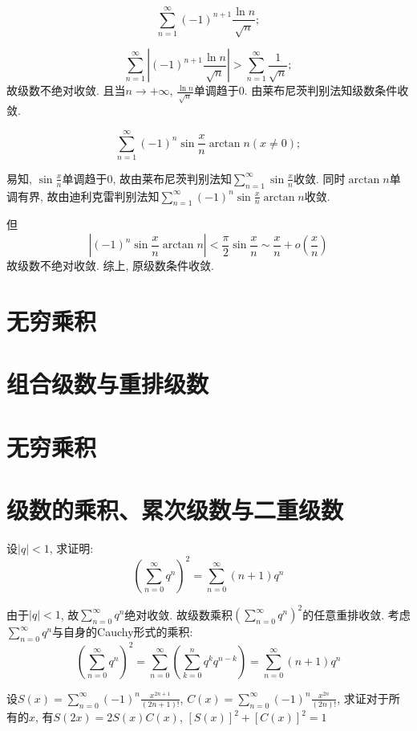 \[
    \sum_{n=1}^{\infty} (-1)^{n+1} \frac{\ln n}{\sqrt{n}};
\]

\[
    \sum_{n=1}^{\infty} \left| (-1)^{n+1} \frac{\ln n}{\sqrt{n}} \right|
    > \sum_{n=1}^{\infty} \frac{1}{\sqrt{n}} ;
\]
故级数不绝对收敛.
且当\(n \to + \infty\), \(\frac{\ln n}{\sqrt{n}}\)单调趋于0. 由莱布尼茨判别法知级数条件收敛.

\[
    \sum_{n=1}^{\infty} (-1)^n \sin \frac{x}{n} \arctan n (x \neq 0);
\]

易知, \(\sin \frac{x}{n}\)单调趋于0, 故由莱布尼茨判别法知\(\sum_{n=1}^{\infty} \sin
\frac{x}{n}\)收敛. 同时\(\arctan n\)单调有界, 故由迪利克雷判别法知\(\sum_{n=1}^{\infty}
(-1)^{n} \sin \frac{x}{n} \arctan n\)收敛.

但\[
    \left| (-1)^{n}\sin \frac{x}{n} \arctan n \right| < \frac{\pi}{2}
    \sin \frac{x}{n} \sim \frac{x}{n} + o(\frac{x}{n})
\]
故级数不绝对收敛. 综上, 原级数条件收敛.

\section{无穷乘积}
\section{组合级数与重排级数}
\section{无穷乘积}
\section{级数的乘积、累次级数与二重级数}
\begin{problem}
    设\(\left\vert q \right\vert < 1\), 求证明:
    \[
        \left( \sum_{n=0}^{\infty} q^{n} \right)^2
        =\sum_{n=0}^{\infty} (n + 1) q^{n}
    \]
\end{problem}
\begin{solution}
    由于\(\left\vert q \right\vert < 1\), 故\(\sum_{n=0}^{\infty}
    q^{n}\)绝对收敛. 故级数乘积\(\left( \sum_{n=0}^{\infty} q^{n} \right)^2\)的任意重排收敛.
    考虑\(\sum_{n=0}^{\infty} q^{n}\)与自身的Cauchy形式的乘积:
    \[
        \left( \sum_{n=0}^{\infty} q^{n} \right)^2
        =\sum_{n=0}^{\infty} \left( \sum_{k=0}^{n} q^{k} q^{n-k} \right)
        =\sum_{n=0}^{\infty} (n + 1) q^{n}
    \]
\end{solution}

\begin{problem}
    设\(S(x) = \sum_{n=0}^{\infty} (-1)^n \frac{x^{2n+1}}{(2n+1)!}\),
    \(C(x) = \sum_{n=0}^{\infty} (-1)^n \frac{x^{2n}}{(2n)!}\),
    求证对于所有的\(x\), 有\(S(2x)=2S(x)C(x)\), \([S(x)]^2+[C(x)]^2=1\)
\end{problem}

